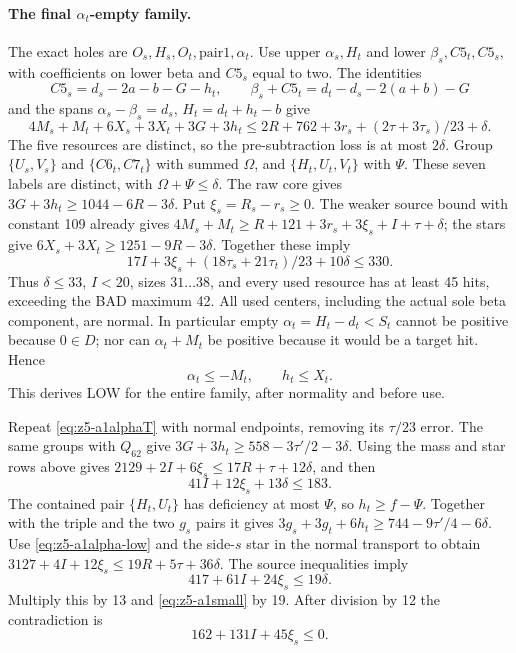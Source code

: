 \documentclass[11pt,letterpaper]{article}
\theoremstyle{definition}\newtheorem{definition}[theorem]{Definition}
\begin{document}
\paragraph{The final $\alpha_t$-empty family.}
The exact holes are $O_s,H_s,O_t,\mathrm{pair1},\alpha_t$.
Use upper $\alpha_s,H_t$ and lower $\beta_s,C5_t,C5_s$, with
coefficients on lower beta and $C5_s$ equal to two. The identities
\[
 C5_s=d_s-2a-b-G-h_t,\qquad
 \beta_s+C5_t=d_t-d_s-2(a+b)-G
\]
and the spans $\alpha_s-\beta_s=d_s$, $H_t=d_t+h_t-b$ give
\begin{equation}\label{eq:z5-a1alphaT}
 4M_s+M_t+6X_s+3X_t+3G+3h_t
 \le2R+762+3r_s+(2\tau+3\tau_s)/23+\delta.
\end{equation}
The five resources are distinct, so the pre-subtraction loss is at most
$2\delta$. Group $\{U_s,V_s\}$ and $\{C6_t,C7_t\}$ with summed
$\Omega$, and $\{H_t,U_t,V_t\}$ with $\Psi$.
These seven labels are distinct, with $\Omega+\Psi\le\delta$.
The raw core gives $3G+3h_t\ge1044-6R-3\delta$.
Put $\xi_s=R_s-r_s\ge0$. The weaker source bound with constant 109
already gives
$4M_s+M_t\ge R+121+3r_s+3\xi_s+I+\tau+\delta$;
the stars give $6X_s+3X_t\ge1251-9R-3\delta$.
Together these imply
\[
 17I+3\xi_s+(18\tau_s+21\tau_t)/23+10\delta\le330.
\]
Thus $\delta\le33$, $I<20$, sizes $31\ldots38$, and every used
resource has at least 45 hits, exceeding the BAD maximum 42.
All used centers, including the actual sole beta component, are normal.
In particular empty $\alpha_t=H_t-d_t<S_t$ cannot be positive
because $0\in D$; nor can $\alpha_t+M_t$ be positive because it
would be a target hit. Hence
\begin{equation}\label{eq:z5-a1alpha-low}
 \alpha_t\le-M_t,\qquad h_t\le X_t.
\end{equation}
This derives LOW for the entire family, after normality and before use.

Repeat \eqref{eq:z5-a1alphaT} with normal endpoints, removing its
$\tau/23$ error. The same groups with $Q_{62}$ give
$3G+3h_t\ge558-3\tau'/2-3\delta$.
Using the mass and star rows above gives
$2129+2I+6\xi_s\le17R+\tau+12\delta$, and then
\begin{equation}\label{eq:z5-a1small}
 41I+12\xi_s+13\delta\le183.
\end{equation}
The contained pair $\{H_t,U_t\}$ has deficiency at most $\Psi$,
so $h_t\ge f-\Psi$. Together with the triple and the two $g_s$
pairs it gives
$3g_s+3g_t+6h_t\ge744-9\tau'/4-6\delta$.
Use \eqref{eq:z5-a1alpha-low} and the side-$s$ star in the normal
transport to obtain
$3127+4I+12\xi_s\le19R+5\tau+36\delta$.
The source inequalities imply
\[
 417+61I+24\xi_s\le19\delta.
\]
Multiply this by 13 and \eqref{eq:z5-a1small} by 19. After division
by 12 the contradiction is
\begin{equation}\label{eq:z5-a1alpha-final}
 162+131I+45\xi_s\le0.
\end{equation}
\end{document}
